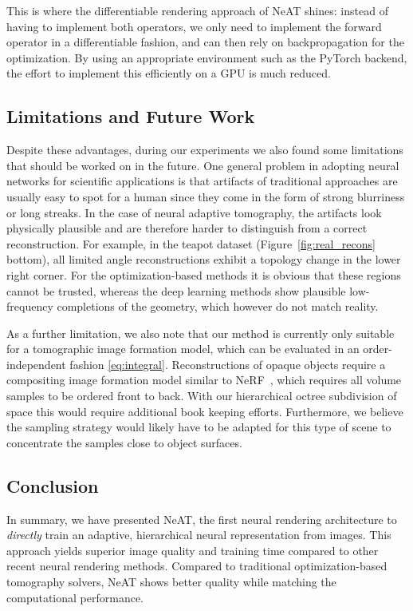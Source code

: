 \documentclass[acmtog,nonacm]{acmart} \acmSubmissionID{0438}
\newcommand{\neat}{NeAT\xspace}
\begin{document}
This is where the differentiable rendering approach of \neat shines:
instead of having to implement both operators, we only need to
implement the forward operator  in a differentiable fashion,
and can then rely on backpropagation for the optimization. By using an
appropriate environment such as the PyTorch backend, the effort to
implement this efficiently on a GPU is much reduced.


\subsection{Limitations and Future Work}
Despite these advantages, during our experiments we also found some limitations that should be worked on in the future.
One general problem in adopting neural networks for scientific applications is that artifacts of traditional approaches are usually easy to spot for a human since they come in the form of strong blurriness or long streaks.
In the case of neural adaptive tomography, the artifacts look
physically plausible and are therefore harder to distinguish from a
correct reconstruction.
For example, in the teapot dataset (Figure~\ref{fig:real_recons}
bottom), all limited angle reconstructions exhibit a topology change
in the lower right corner. For the optimization-based methods it is
obvious that these regions cannot be trusted, whereas the deep
learning methods show plausible low-frequency completions of the
geometry, which however do not match reality.


As a further limitation, we also note that our method is currently
only suitable for a tomographic image formation model, which can be
evaluated in an order-independent fashion
\eqref{eq:integral}. Reconstructions of opaque objects require a
compositing image formation model similar to
NeRF~\cite{mildenhall2020nerf}, which requires all volume samples to
be ordered front to back. With our hierarchical octree subdivision of
space this would require additional book keeping efforts. Furthermore,
we believe the sampling strategy would likely have to be adapted for
this type of scene to concentrate the samples close to object
surfaces.  
\subsection{Conclusion}

In summary, we have presented \neat, the first neural rendering
architecture to {\em directly} train an adaptive, hierarchical neural
representation from images. This approach yields superior image
quality and training time compared to other recent neural rendering
methods. Compared to traditional optimization-based tomography
solvers, \neat shows better quality while matching the computational
performance.
\end{document}
